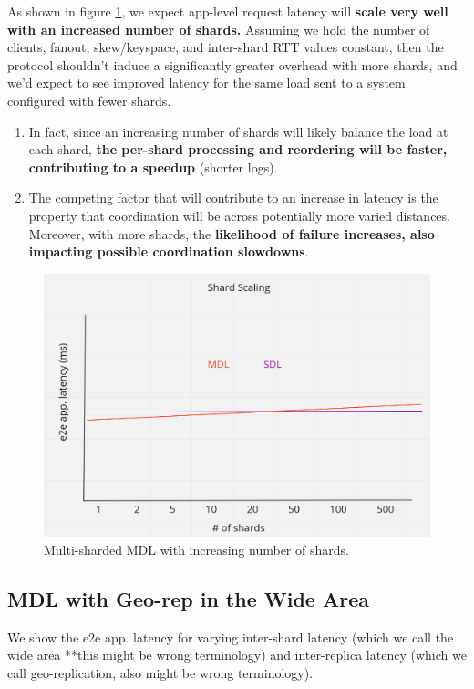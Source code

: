 As shown in figure \ref{fig:shard-scaling}, we expect app-level request latency will \textbf{scale very well with an increased number of shards.} Assuming we hold the number of clients, fanout, skew/keyspace, and inter-shard RTT values constant, then the protocol shouldn't induce a significantly greater overhead with more shards, and we'd expect to see improved latency for the same load sent to a system configured with fewer shards. 
\begin{enumerate}
    \item In fact, since an increasing number of shards will likely balance the load at each shard, \textbf{the per-shard processing and reordering will be faster, contributing to a speedup} (shorter logs). 
    \item The competing factor that will contribute to an increase in latency is the property that coordination will be across potentially more varied distances. Moreover, with more shards, the \textbf{likelihood of failure increases, also impacting possible coordination slowdowns}.
\end{enumerate}


\begin{figure}[!htb]
\includegraphics[scale=.20]{shard_scaling.png}
\caption{Multi-sharded MDL with increasing number of shards.}
\label{fig:shard-scaling}
\end{figure}

\subsection{MDL with Geo-rep in the Wide Area}
\label{sec:wide}
We show the e2e app. latency for varying inter-shard latency (which we call the wide area **this might be wrong terminology) and inter-replica latency (which we call geo-replication, also might be wrong terminology).

